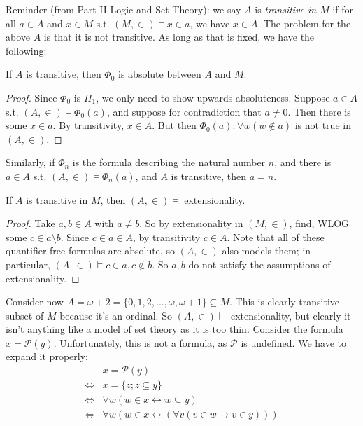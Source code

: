 \documentclass[a4paper]{article}
\begin{document}
Reminder (from Part II Logic and Set Theory): we say $A$ is \emph{transitive in $M$} if for all $a \in A$ and $x \in M$ s.t. $(M,\in) \vDash x \in a$, we have $x \in A$. The problem for the above $A$ is that it is not transitive. As long as that is fixed, we have the following:

\begin{prop}
If $A$ is transitive, then $\Phi_0$ is absolute between $A$ and $M$.
\begin{proof}
Since $\Phi_0$ is $\Pi_1$, we only need to show upwards absoluteness. Suppose $a \in A$ s.t. $(A,\in) \vDash \Phi_0(a)$, and suppose for contradiction that $a \neq 0$. Then there is some $x \in a$. By transitivity, $x \in A$. But then $\Phi_0(a): \forall w (w \not\in a)$ is not true in $(A,\in)$.
\end{proof}
\end{prop}

Similarly, if $\Phi_n$ is the formula describing the natural number $n$, and there is $a \in A$ s.t. $(A,\in) \vDash \Phi_n(a)$, and $A$ is transitive, then $a=n$.

\begin{prop}
If $A$ is transitive in $M$, then $(A,\in) \vDash$ extensionality.
\begin{proof}
Take $a,b \in A$ with $a \neq b$. So by extensionality in $(M,\in)$, find, WLOG some $c \in a \setminus b$. Since $c \in a \in A$, by transitivity $c \in A$. Note that all of these quantifier-free formulas are absolute, so $(A,\in)$ also models them; in particular, $(A,\in) \vDash c \in a,c \not\in b$. So $a,b$ do not satisfy the assumptions of extensionality.
\end{proof}
\end{prop}

Consider now $A=\omega+2 = \{0,1,2,...,\omega,\omega+1\} \subseteq M$. This is clearly transitive subset of $M$ because it's an ordinal. So $(A,\in) \vDash$ extensionality, but clearly it isn't anything like a model of set theory as it is too thin. Consider the formula $x=\mathcal{P}(y)$. Unfortunately, this is not a formula, as $\mathcal{P}$ is undefined. We have to expand it properly:
\begin{equation*}
\begin{aligned}
&x = \mathcal{P}(y)\\
\iff &x=\{z;z \subseteq y\}\\
\iff &\forall w (w \in x \leftrightarrow w \subseteq y)\\
\iff &\forall w (w \in x \leftrightarrow(\forall v (v \in w \to v \in y)))
\end{aligned}
\end{equation*}
\end{document}
